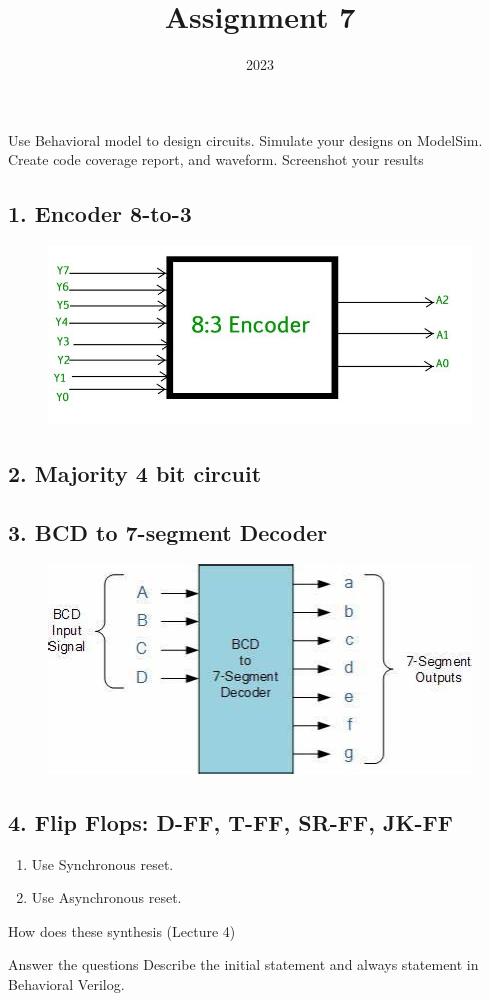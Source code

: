 \documentclass{vhdl-assignment}
\title{Assignment 7}
\date{2023}
\begin{document}
\maketitle
\thispagestyle{fancy}

\begin{problem}{}
    Use Behavioral model to design circuits.
    Simulate your designs on ModelSim.
    Create code coverage report, and waveform.
    Screenshot your results

    \subsection*{1. Encoder 8-to-3}
    \begin{figure}[H]
        \centering
        \includegraphics{assets/8_3_Encoder.jpg}
    \end{figure}

    \subsection*{2. Majority 4 bit circuit}

    \subsection*{3. BCD to 7-segment Decoder}
    \begin{figure}[H]
        \centering
        \includegraphics{assets/BCD_7_segment_Decoder.jpg}
    \end{figure}

    \subsection*{4. Flip Flops: D-FF, T-FF, SR-FF, JK-FF}
    \begin{enumerate}
        \item Use Synchronous reset.
        \item Use Asynchronous reset.
    \end{enumerate}

    How does these synthesis (Lecture 4)    
\end{problem}

\begin{problem}{Answer the questions}
    Describe the initial statement and always statement in Behavioral Verilog.
\end{problem}
\end{document}

